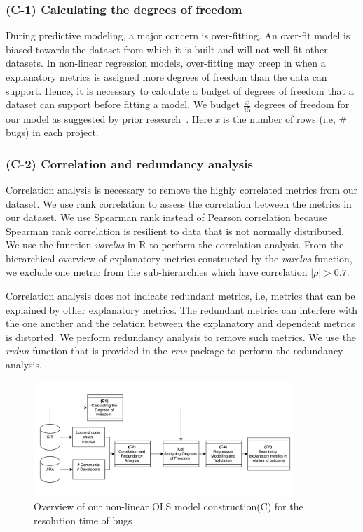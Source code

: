 

\subsubsection*{(C-1) Calculating the degrees of freedom}
During predictive modeling, a major concern is over-fitting. An over-fit model is biased towards the dataset from which it is built and will not well fit other datasets. In non-linear regression models, over-fitting may creep in when a explanatory metrics is assigned more degrees of freedom than the data can support. Hence, it is necessary to calculate a budget of degrees of freedom that a dataset can support before fitting a model. We budget $\frac{x}{15}$ degrees of freedom for our model as suggested by prior research~\cite{DegreesofFreedom}. Here \textsl{x} is the number of rows (i.e, \# bugs) in each project. 


\subsubsection*{(C-2) Correlation and redundancy analysis}

Correlation analysis is necessary to remove the highly correlated metrics from our dataset. We use   rank correlation to assess the correlation between the metrics in our dataset. We use Spearman rank instead of Pearson correlation because Spearman rank correlation is resilient to data that is not normally distributed. We use the function \textsl{varclus} in R to perform the correlation analysis. From the hierarchical overview of explanatory metrics constructed by the \emph{varclus} function, we exclude one metric from the sub-hierarchies which have correlation $|\rho| > 0.7 $.

Correlation analysis does not indicate redundant metrics, i.e, metrics that can be explained by other explanatory metrics. The redundant metrics can interfere with the one another and the relation between the explanatory and dependent metrics is distorted. We perform redundancy analysis to remove such metrics. We use the \textsl{redun} function that is provided in the \textsl{rms} package to perform the redundancy analysis.

\begin{figure}
	\centering
	\includegraphics[width=9.8cm]{MethodologyOLS}
	\caption{Overview of our non-linear OLS model construction(C) for the resolution time of bugs}
	\label{fig:MethodologyOLS}
\end{figure}



